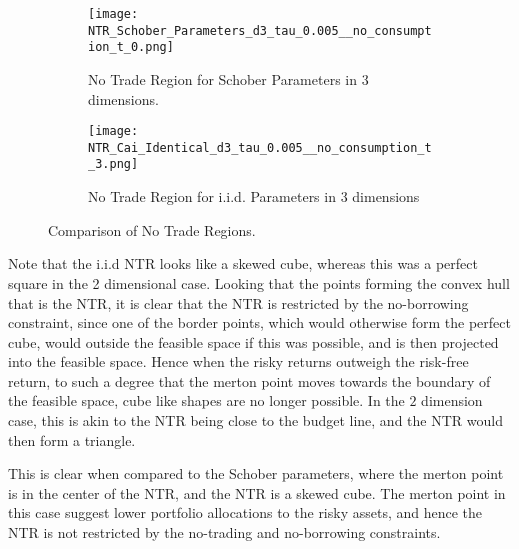 \documentclass[11pt]{article}
\begin{document}
\begin{figure}[!ht]
    \centering
    \begin{subfigure}[t]{0.48\textwidth}
        \centering
        \texttt{[image: NTR\_Schober\_Parameters\_d3\_tau\_0.005\_\_no\_consumption\_t\_0.png]}
        \caption{No Trade Region for Schober Parameters in 3 dimensions.}
        \label{fig:NTR_3d_Schober}
    \end{subfigure}%
    \hfill
    \begin{subfigure}[t]{0.48\textwidth}
        \centering
        \texttt{[image: NTR\_Cai\_Identical\_d3\_tau\_0.005\_\_no\_consumption\_t\_3.png]}
        \caption{No Trade Region for i.i.d. Parameters in 3 dimensions}
        \label{fig:NTR_3d_iid_Correlation}
    \end{subfigure}

    \caption{Comparison of No Trade Regions.}
    \label{fig:comparison_NTR_3d}
\end{figure}
Note that the i.i.d NTR looks like a skewed cube, whereas this was a perfect square in the 2 dimensional case.
Looking that the points forming the convex hull that is the NTR, it is clear that the NTR is restricted by the no-borrowing constraint,
since one of the border points, which would otherwise form the perfect cube, would outside the feasible space if this was possible, and is then projected into the feasible space. 
Hence when the risky returns outweigh the risk-free return,
to such a degree that the merton point moves towards the boundary of the feasible space, cube like shapes are no longer possible.
In the $2$ dimension case, this is akin to the \ac{NTR} being close to the budget line, and the \ac{NTR} would then form a triangle.

This is clear when compared to the Schober parameters, where the merton point is in the center of the NTR, and the NTR is a skewed cube.
The merton point in this case suggest lower portfolio allocations to the risky assets, and hence the NTR is not restricted by the no-trading and no-borrowing constraints.
\end{document}
